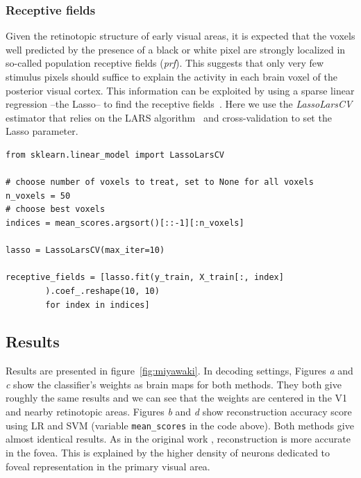 \documentclass{frontiersSCNS} %
\begin{document}
\subsubsection{Receptive fields}
Given the retinotopic structure of early visual areas, it is expected
that the voxels well predicted by the presence of a black or white pixel
are strongly localized in so-called population
receptive fields (\textit{prf}). This suggests that only very few
stimulus pixels should suffice to explain the activity in each brain
voxel of the posterior visual cortex.
%
This information can be exploited by using a sparse linear
regression --the Lasso-- to find the receptive fields~\citep{tibshirani:96}.
Here we use the \emph{LassoLarsCV} estimator that relies on the LARS
algorithm~\citep{Efron04leastangle} and
cross-validation to set the Lasso parameter.

\begin{lstlisting}
from sklearn.linear_model import LassoLarsCV

# choose number of voxels to treat, set to None for all voxels
n_voxels = 50
# choose best voxels
indices = mean_scores.argsort()[::-1][:n_voxels]

lasso = LassoLarsCV(max_iter=10)

receptive_fields = [lasso.fit(y_train, X_train[:, index]
        ).coef_.reshape(10, 10)
        for index in indices]

\end{lstlisting}

\subsection{Results}

\label{sec:miyawaki_results}
Results are presented in figure~\ref{fig:miyawaki}.
In decoding settings, Figures \textit{a} and \textit{c} show the classifier's weights as brain
maps for both methods. They both give roughly the same results and we can
see that the weights are centered in the V1 and nearby retinotopic areas.
Figures \textit{b} and \textit{d} show reconstruction
accuracy score using LR and SVM
(variable \texttt{mean\_scores} in the code above).
Both methods give almost identical results. 
As in the original work \citep{miyawaki2008}, reconstruction is more
accurate in the fovea.
This is explained by the higher density of neurons dedicated to
foveal representation in the primary visual area.
\end{document}
